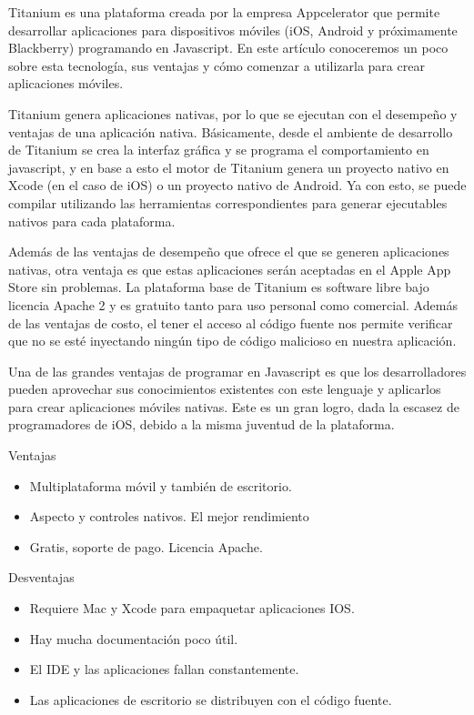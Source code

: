 \setlength{\parskip}{5mm}
Titanium es una plataforma creada por la empresa Appcelerator que permite desarrollar aplicaciones para dispositivos móviles (iOS, Android y próximamente Blackberry) programando en Javascript. En este artículo conoceremos un poco sobre esta tecnología, sus ventajas y cómo comenzar a utilizarla para crear aplicaciones móviles.

Titanium genera aplicaciones nativas, por lo que se ejecutan con el desempeño y ventajas de una aplicación nativa. Básicamente, desde el ambiente de desarrollo de Titanium se crea la interfaz gráfica y se programa el comportamiento en javascript, y en base a esto el motor de Titanium genera un proyecto nativo en Xcode (en el caso de iOS) o un proyecto nativo de Android. Ya con esto, se puede compilar utilizando las herramientas correspondientes para generar ejecutables nativos para cada plataforma.

Además de las ventajas de desempeño que ofrece el que se generen aplicaciones nativas, otra ventaja es que estas aplicaciones serán aceptadas en el Apple App Store sin problemas.
La plataforma base de Titanium es software libre bajo licencia Apache 2 y es gratuito tanto para uso personal como comercial. Además de las ventajas de costo, el tener el acceso al código fuente nos permite verificar que no se esté inyectando ningún tipo de código malicioso en nuestra aplicación.

Una de las grandes ventajas de programar en Javascript es que los desarrolladores pueden aprovechar sus conocimientos existentes con este lenguaje y aplicarlos para crear aplicaciones móviles nativas. Este es un gran logro, dada la escasez de programadores de iOS, debido a la misma juventud de la plataforma.

Ventajas
\setlength{\parskip}{0mm}
\begin{itemize}

    \item Multiplataforma móvil y también de escritorio.
    
    \item Aspecto y controles nativos. El mejor rendimiento
    
    \item Gratis, soporte de pago. Licencia Apache.

\end{itemize}

Desventajas

\begin{itemize}

    \item Requiere Mac y Xcode para empaquetar aplicaciones IOS.
    
    \item Hay mucha documentación poco útil.
    
    \item El IDE y las aplicaciones fallan constantemente.
    
    \item Las aplicaciones de escritorio se distribuyen con el código fuente.

\end{itemize}

